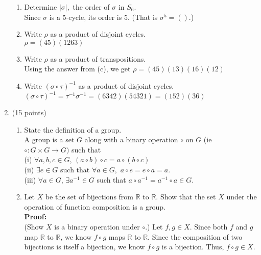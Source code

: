 \documentclass[12pt]{article}
\newcommand{\bbR}{\mathbb{R}}
\begin{document}
\begin{enumerate}
\begin{enumerate}
	\item Determine $| \sigma |,$ the order of $\sigma$ in $S_6.$\\
	
	Since $\sigma$ is a 5-cycle, its order is 5. (That is $\sigma^5=().$)
	\vfill
	\item Write $\rho$ as a product of disjoint cycles.\\
	
	$\rho=(45)(1263)$
	\vfill
	\item Write $\rho$ as a product of transpositions.	\\
	
	Using the answer from (c), we get $\rho=(45)(13)(16)(12)$
	\vfill
	\item Write $(\sigma \circ \tau )^{-1}$ as a product of disjoint cycles.\\
	
	$(\sigma \circ \tau )^{-1}=\tau^{-1}\sigma^{-1}=(6342)(54321)=(152)(36)$
	
	\end{enumerate}

\item (15 points)
	\begin{enumerate}
	\item State the definition of a group.\\
	A group is a set $G$ along with a binary operation $\circ$ on $G$ (ie $\circ : G \times G \to G)$ such that\\
	
	(i) $\forall a,b,c \in G$, $(a\circ b) \circ c= a \circ (b \circ c)$\\
	(ii) $\exists e \in G$ such that $\forall a \in G,$ $a\circ e=e\circ a=a.$\\
	(iii) $\forall a \in G$, $\exists a^{-1} \in G$ such that $a\circ a^{-1}=a^{-1}\circ a \in G.$\\
	
	\item Let $X$ be the set of bijections from $\mathbb{R}$ to $\mathbb{R}.$ Show that the set $X$ under the operation of function composition is a group. \\
	
\textbf{Proof:}\\
(Show $X$ is a binary operation under $\circ$.) Let $f,g \in X.$ Since both $f$ and $g$ map $\bbR$ to $\bbR$, we know $f\circ g$ maps $\bbR$ to $\bbR.$ Since the composition of two bijections is itself a bijection, we know $f\circ g$ is a bijection. Thus, $f\circ g \in X.$\\


\end{enumerate}
\end{enumerate}
\end{document}
